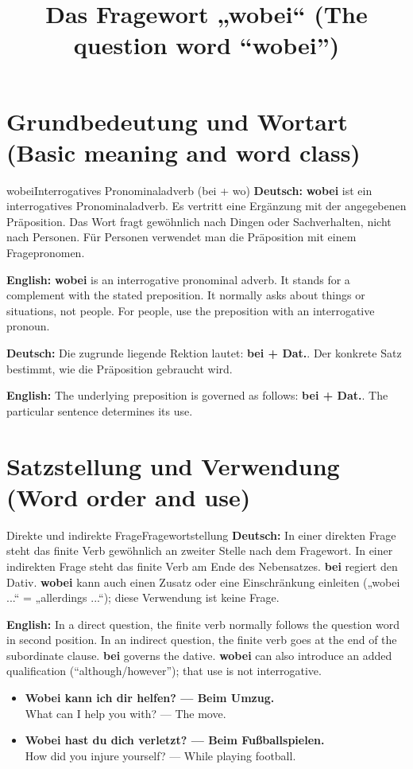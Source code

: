 \documentclass[a4paper,11pt]{article}
\title{Das Fragewort „wobei“ (The question word “wobei”)}
\date{}
\newcommand{\GermanText}[1]{\textbf{Deutsch: }#1\par}
\newcommand{\EnglishText}[1]{{\small\color{SoftGray}\textbf{English: }#1\par}}
\newcommand{\ExampleItem}[2]{\item \textbf{#1}\\{\small\color{SoftGray}#2}}
\begin{document}
\maketitle
\tableofcontents
\newpage
\section{Grundbedeutung und Wortart (Basic meaning and word class)}
\begin{grammarentry}{wobei}{Interrogatives Pronominaladverb (bei + wo)}
\GermanText{\textbf{wobei} ist ein interrogatives Pronominaladverb. Es vertritt eine Ergänzung mit der angegebenen Präposition. Das Wort fragt gewöhnlich nach Dingen oder Sachverhalten, nicht nach Personen. Für Personen verwendet man die Präposition mit einem Fragepronomen.}
\EnglishText{\textbf{wobei} is an interrogative pronominal adverb. It stands for a complement with the stated preposition. It normally asks about things or situations, not people. For people, use the preposition with an interrogative pronoun.}
\GermanText{Die zugrunde liegende Rektion lautet: \textbf{bei + Dat.}. Der konkrete Satz bestimmt, wie die Präposition gebraucht wird.}
\EnglishText{The underlying preposition is governed as follows: \textbf{bei + Dat.}. The particular sentence determines its use.}
\end{grammarentry}
\section{Satzstellung und Verwendung (Word order and use)}
\begin{grammarentry}{Direkte und indirekte Frage}{Fragewortstellung}
\GermanText{In einer direkten Frage steht das finite Verb gewöhnlich an zweiter Stelle nach dem Fragewort. In einer indirekten Frage steht das finite Verb am Ende des Nebensatzes. \textbf{bei} regiert den Dativ. \textbf{wobei} kann auch einen Zusatz oder eine Einschränkung einleiten („wobei ...“ = „allerdings ...“); diese Verwendung ist keine Frage.}
\EnglishText{In a direct question, the finite verb normally follows the question word in second position. In an indirect question, the finite verb goes at the end of the subordinate clause. \textbf{bei} governs the dative. \textbf{wobei} can also introduce an added qualification (“although/however”); that use is not interrogative.}
\end{grammarentry}
\begin{exbox}\begin{itemize}
\ExampleItem{Wobei kann ich dir helfen? — Beim Umzug.}{What can I help you with? — The move.}
\ExampleItem{Wobei hast du dich verletzt? — Beim Fußballspielen.}{How did you injure yourself? — While playing football.}
\end{itemize}\end{exbox}
\end{document}
